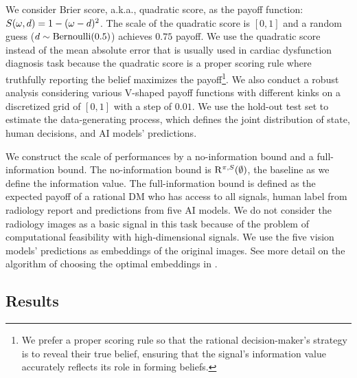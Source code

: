 We consider Brier score, a.k.a., quadratic score, as the payoff function: $S(\omega, d) = 1 - (\omega - d)^2$. The scale of the quadratic score is $[0, 1]$ and a random guess ($d \sim \text{Bernoulli}(0.5)$) achieves $0.75$ payoff. We use the quadratic score instead of the mean absolute error that is usually used in cardiac dysfunction diagnosis task because the quadratic score is a proper scoring rule where truthfully reporting the belief maximizes the payoff\footnote{We prefer a proper scoring rule so that the rational decision-maker’s strategy is to reveal their true belief, ensuring that the signal’s information value accurately reflects its role in forming beliefs.}. We also conduct a robust analysis considering various V-shaped payoff functions with different kinks on a discretized grid of $[0, 1]$ with a step of $0.01$.
We use the hold-out test set to estimate the data-generating process, which defines the joint distribution of state, human decisions, and AI models' predictions.

We construct the scale of performances by a no-information bound and a full-information bound.
The no-information bound is $\mathrm{R}^{\pi, S}(\emptyset)$, the baseline as we define the information value.
The full-information bound is defined as the expected payoff of a rational DM who has access to all signals, human label from radiology report and predictions from five AI models.
We do not consider the radiology images as a basic signal in this task because of the problem of computational feasibility with high-dimensional signals.
We use the five vision models' predictions as embeddings of the original images. See more detail on the algorithm of choosing the optimal embeddings in .

 \mvspace{-2mm}
\subsection{Results}
 \mvspace{-2mm}

